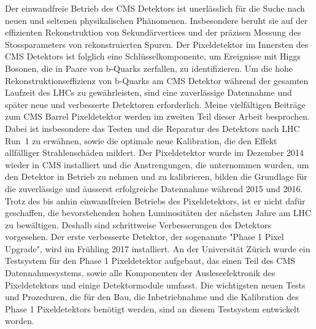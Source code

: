 \noindent Der einwandfreie Betrieb des CMS Detektors ist unerl\"asslich f\"ur die Suche nach neuen und seltenen physikalischen Ph\"anomenen. Insbesondere beruht sie auf der effizienten Rekonstruktion von Sekund\"arvertices und der pr\"azisen Messung des Stossparameters von rekonstruierten Spuren. Der Pixeldetektor im Innersten des CMS Detektors ist folglich eine Schl\"usselkomponente, um Ereignisse mit Higgs Bosonen, die in Paare von b-Quarks zerfallen, zu identifizieren. Um die hohe Rekonstruktionseffizienz von b-Quarks am CMS Detektor w\"ahrend der gesamten Laufzeit des LHCs zu gew\"ahrleisten, sind eine zuverl\"assige Datennahme und sp\"ater neue und verbesserte Detektoren erforderlich. Meine vielf\"altigen Beitr\"age zum CMS Barrel Pixeldetektor werden im zweiten Teil dieser Arbeit besprochen. Dabei ist insbesondere das Testen und die Reparatur des Detektors nach LHC Run~1 zu erw\"ahnen, sowie die optimale neue Kalibration, die den Effekt allf\"alliger Strahlensch\"aden mildert.
Der Pixeldetektor wurde im Dezember 2014 wieder in CMS installiert und die Anstrengungen, die unternommen wurden, um den Detektor in Betrieb zu nehmen und zu kalibrieren, bilden die Grundlage f\"ur die zuverl\"assige und \"ausserst erfolgreiche Datennahme w\"ahrend 2015 und 2016. Trotz des bis anhin einwandfreien Betriebs des Pixeldetektors, ist er nicht daf\"ur geschaffen, die bevorstehenden hohen Luminosit\"aten der n\"achsten Jahre am LHC zu bew\"altigen. Deshalb sind schrittweise Verbesserungen des Detektors vorgesehen. Der erste verbesserte Detektor, der sogenannte "Phase 1 Pixel Upgrade", wird im Fr\"uhling 2017 installiert. An der Universit\"at Z\"urich wurde ein Testsystem f\"ur den Phase 1 Pixeldetektor aufgebaut, das einen Teil des CMS Datennahmesystems, sowie alle Komponenten der Ausleseelektronik des Pixeldetektors und einige Detektormodule umfasst. Die wichtigsten neuen Tests und Prozeduren, die f\"ur den Bau, die Inbetriebnahme und die Kalibration des Phase 1 Pixeldetektors ben\"otigt werden, sind an diesem Testsystem entwickelt worden. 

\vspace*{\fill}
